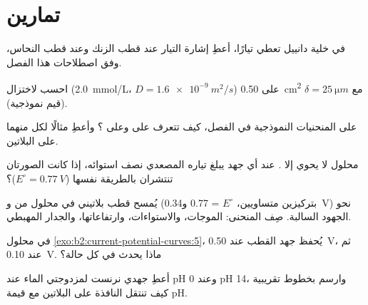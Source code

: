 \section{تمارين}

\begin{exercise}[$\star$]\label{exo:b2:current-potential-curves:1}
في خلية دانييل تعطي تيارًا، أعطِ إشارة التيار عند قطب
الزنك وعند قطب النحاس، وفق اصطلاحات هذا
الفصل.
\end{exercise}

\begin{exercise}[$\star$]\label{exo:b2:current-potential-curves:2}
احسب  لاختزال  (\qty{2.0}{mmol/L}، $D =
\qty{1.6e-9}{m^2/s}$) على \qty{0.50}{cm^2} مع $\delta = \qty{25}{\micro m}$
(قيم نموذجية).
\end{exercise}

\begin{exercise}[$\star$]\label{exo:b2:current-potential-curves:3}
على المنحنيات النموذجية في الفصل، كيف تتعرف على  وعلى ؟
وأعطِ مثالًا لكل منهما على البلاتين.
\end{exercise}

\begin{exercise}[$\star$]\label{exo:b2:current-potential-curves:4}
محلول لا يحوي إلا . عند أي جهد يبلغ تياره المصعدي
نصف استوائه، إذا كانت الصورتان تنتشران بالطريقة نفسها ($E^\circ = \qty{0.77}{V}$)؟
\end{exercise}

\begin{exercise}[$\star\star$]\label{exo:b2:current-potential-curves:5}
يُمسح قطب بلاتيني في محلول من  و (بتركيزين
متساويين، $E^\circ$ = 0.77 و\qty{0.34}{V}) نحو الجهود السالبة. صِف
المنحنى: الموجات، والاستواءات، وارتفاعاتها، والجدار
المهبطي.
\end{exercise}

\begin{exercise}[$\star\star$]\label{exo:b2:current-potential-curves:6}
في محلول \cref{exo:b2:current-potential-curves:5}، يُحفظ جهد
القطب عند \qty{0.50}{V}، ثم عند \qty{0.10}{V}. ماذا يحدث في
كل حالة؟
\end{exercise}

\begin{exercise}[$\star\star$]\label{exo:b2:current-potential-curves:7}
أعطِ جهدي نرنست لمزدوجتي الماء عند pH 0 وعند pH 14، وارسم
بخطوط تقريبية كيف تنتقل النافذة على البلاتين مع قيمة pH.
\end{exercise}

